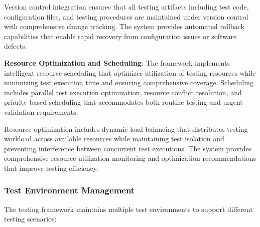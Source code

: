 \documentclass[11pt,a4paper]{report}
\begin{document}
Version control integration ensures that all testing artifacts including test code, configuration files, and testing
procedures are maintained under version control with comprehensive change tracking. The system provides automated
rollback capabilities that enable rapid recovery from configuration issues or software defects.

\textbf{Resource Optimization and Scheduling}: The framework implements intelligent resource scheduling that optimizes
utilization of testing resources while minimizing test execution time and ensuring comprehensive coverage. Scheduling
includes parallel test execution optimization, resource conflict resolution, and priority-based scheduling that
accommodates both routine testing and urgent validation requirements.

Resource optimization includes dynamic load balancing that distributes testing workload across available resources while
maintaining test isolation and preventing interference between concurrent test executions. The system provides
comprehensive resource utilization monitoring and optimization recommendations that improve testing efficiency.

\subsubsection{Test Environment Management}

The testing framework maintains multiple test environments to support different testing scenarios:
\end{document}
